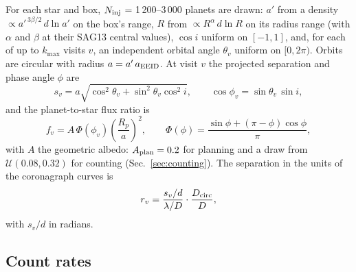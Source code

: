 \documentclass[11pt,a4paper]{article}
\begin{document}
For each star and box, $N_{\rm inj}$ = 1\,200--3\,000 planets are drawn: $a'$ from a density
$\propto a'^{\,3\beta/2}\,d\ln a'$ on the box's range, $R$ from $\propto R^{\alpha}\,d\ln R$ on
its radius range (with $\alpha$ and $\beta$ at their SAG13 central values), $\cos i$ uniform on
$[-1, 1]$, and, for each of up to $k_{\max}$ visits $v$, an independent orbital angle $\theta_v$
uniform on $[0, 2\pi)$. Orbits are circular with radius $a = a'\,a_{\rm EEID}$. At visit $v$ the
projected separation and phase angle $\phi$ are
\begin{equation}
s_v = a\sqrt{\cos^2\theta_v + \sin^2\theta_v\cos^2 i}, \qquad
\cos\phi_v = \sin\theta_v\,\sin i,
\label{eq:geometry}
\end{equation}
and the planet-to-star flux ratio is
\begin{equation}
f_v = A\,\Phi(\phi_v)\left(\frac{R_p}{a}\right)^{2}, \qquad
\Phi(\phi) = \frac{\sin\phi + (\pi - \phi)\cos\phi}{\pi},
\label{eq:fluxratio}
\end{equation}
with $A$ the geometric albedo: $A_{\rm plan} = 0.2$ for planning and a draw from
$\mathcal{U}(0.08, 0.32)$ for counting (Sec.~\ref{sec:counting}). The separation in the units of
the coronagraph curves is
\begin{equation}
r_v = \frac{s_v/d}{\lambda/D}\cdot\frac{D_{\rm circ}}{D},
\label{eq:separation}
\end{equation}
with $s_v/d$ in radians.

\subsection{Count rates}
\end{document}
